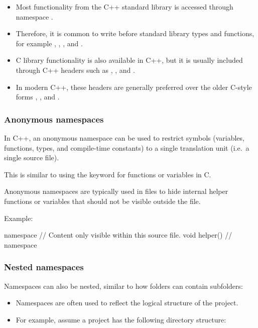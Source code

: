 \note
\begin{itemize}
  \item Most functionality from the C++ standard library is accessed through namespace
    .
  \item Therefore, it is common to write  before standard library types and functions,
    for example , , , and
    .
  \item C library functionality is also available in C++, but it is usually included through C++
    headers such as , , and .
  \item In modern C++, these headers are generally preferred over the older C-style forms
    , , and .
\end{itemize}

\subsubsection{Anonymous namespaces}
In C++, an anonymous namespace can be used to restrict symbols (variables, functions, types, and
compile-time constants) to a single translation unit (i.e.\ a single source file).

This is similar to using the keyword  for functions or variables in C.

Anonymous namespaces are typically used in  files to hide internal helper functions or
variables that should not be visible outside the file.

Example:

\begin{cppcode}
namespace
{
// Content only visible within this source file.
void helper() {}
} // namespace
\end{cppcode}

\subsubsection{Nested namespaces}
Namespaces can also be nested, similar to how folders can contain subfolders:
\begin{itemize}
  \item Namespaces are often used to reflect the logical structure of the project.
  \item For example, assume a project has the following directory structure:
\end{itemize}

